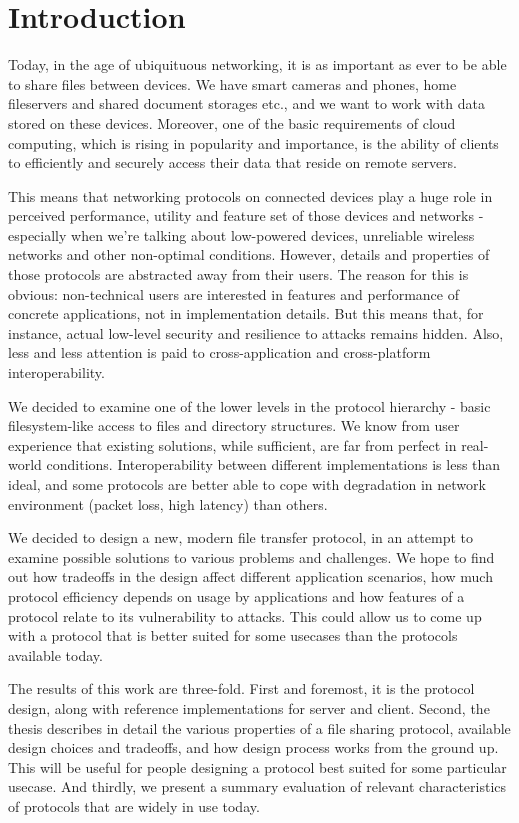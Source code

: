 \chapter*{Introduction}

Today, in the age of ubiquituous networking, it is as important as ever to be able to share files between
devices. We have smart cameras and phones, home fileservers and shared document storages etc., and we want to
work with data stored on these devices. Moreover, one of the basic requirements of cloud computing, which is
rising in popularity and importance, is the ability of clients to efficiently and securely access their data
that reside on remote servers.

This means that networking protocols on connected devices play a huge role in perceived performance, utility
and feature set of those devices and networks - especially when we're talking about low-powered devices,
unreliable wireless networks and other non-optimal conditions. However, details and properties of those
protocols are abstracted away from their users. The reason for this is obvious: non-technical users are
interested in features and performance of concrete applications, not in implementation details. But this means
that, for instance, actual low-level security and resilience to attacks remains hidden. Also, less and less
attention is paid to cross-application and cross-platform interoperability.

We decided to examine one of the lower levels in the protocol hierarchy - basic filesystem-like access to
files and directory structures. We know from user experience that existing solutions, while sufficient, are
far from perfect in real-world conditions. Interoperability between different implementations is less than ideal,
and some protocols are better able to cope with degradation in network environment (packet loss, high latency)
than others.

We decided to design a new, modern file transfer protocol, in an attempt to examine possible solutions to
various problems and challenges. We hope to find out how tradeoffs in the design affect different application
scenarios, how much protocol efficiency depends on usage by applications and how features of a protocol relate
to its vulnerability to attacks. This could allow us to come up with a protocol that is better suited for some
usecases than the protocols available today.

The results of this work are three-fold. First and foremost, it is the protocol design, along with reference
implementations for server and client. Second, the thesis describes in detail the various properties of a file
sharing protocol, available design choices and tradeoffs, and how design process works from the ground up.
This will be useful for people designing a protocol best suited for some particular usecase. And thirdly, we
present a summary evaluation of relevant characteristics of protocols that are widely in use today.
